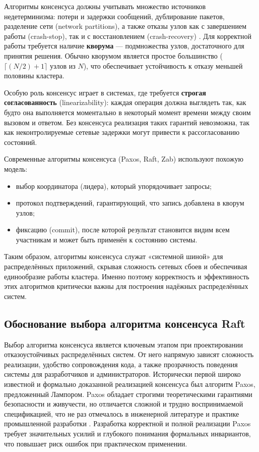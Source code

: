 Алгоритмы консенсуса должны учитывать множество источников недетерминизма:
потери и задержки сообщений, дублирование пакетов, разделение сети (network
partitions), а также отказы узлов как с завершением работы (crash-stop), так и
с восстановлением (crash-recovery) \cite{birman2012, kleppmann2017}. Для
корректной работы требуется наличие \textbf{кворума} — подмножества узлов,
достаточного для принятия решения. Обычно кворумом является простое большинство
($\lceil (N/2) + 1 \rceil$ узлов из $N$), что обеспечивает устойчивость к
отказу меньшей половины кластера.

Особую роль консенсус играет в системах, где требуется \textbf{строгая
согласованность} (linearizability): каждая операция должна выглядеть так, как
будто она выполняется моментально в некоторый момент времени между своим
вызовом и ответом. Без консенсуса реализация таких гарантий невозможна, так как
неконтролируемые сетевые задержки могут привести к рассогласованию состояний.

Современные алгоритмы консенсуса (Paxos, Raft, Zab) используют
похожую модель:
\begin{itemize}
    \item выбор координатора (лидера), который упорядочивает запросы;
    \item протокол подтверждений, гарантирующий, что запись
    добавлена в кворум узлов;
    \item фиксацию (commit), после которой результат становится видим
    всем участникам и может быть применён к состоянию системы.
\end{itemize}

Таким образом, алгоритмы консенсуса служат «системной шиной» для распределённых
приложений, скрывая сложность сетевых сбоев и обеспечивая единообразие работы
кластера. Именно поэтому корректность и эффективность этих алгоритмов
критически важны для построения надёжных распределённых систем.

\subsection{Обоснование выбора алгоритма консенсуса Raft}

Выбор алгоритма консенсуса является ключевым этапом при проектировании
отказоустойчивых распределённых систем. От него напрямую зависят сложность
реализации, удобство сопровождения кода, а также прозрачность поведения системы
для разработчиков и администраторов. Исторически первой широко известной и
формально доказанной реализацией консенсуса был алгоритм Paxos, предложенный
Лампором. Paxos обладает строгими теоретическими гарантиями безопасности и
живучести, но отличается сложной и трудно воспринимаемой спецификацией, что не
раз отмечалось в инженерной литературе и практике промышленной разработки
\cite{lamport2001paxos}. Разработка корректной и полной реализации
Paxos требует значительных усилий и глубокого понимания формальных инвариантов,
что повышает риск ошибок при практическом применении.

